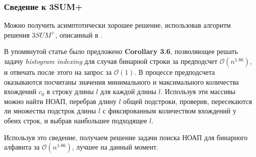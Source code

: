\subsubsection{Сведение к 3SUM+}

Можно получить асимптотически хорошее решение, использовав алгоритм решения $3SUM^+$, описанный в \cite{2}. 

В упомянутой статье было предложено \textbf{Corollary 3.6}, позволяющее решать задачу \textit{histogram indexing} для случая бинарной строки за предподсчет $\mathcal{O}(n^{1.86})$, и отвечать после этого на запрос за $\mathcal{O}(1)$. В процессе предподсчета оказываются посчитаны значения минимального и максимального количества вхождений $c_0$ в строку длины $l$ для каждой длины $l$. Используя эти массивы можно найти НОАП, перебрав длину $l$ общей подстроки, проверив, пересекаются ли множества подстрок длины $l$ с фиксированным количеством вхождений у обеих строк, и выбрав наибольшее подходящее $l$.

Используя это сведение, получаем решение задачи поиска НОАП для бинарного алфавита за $\mathcal{O}(n^{1.86})$, лучшее на данный момент.

